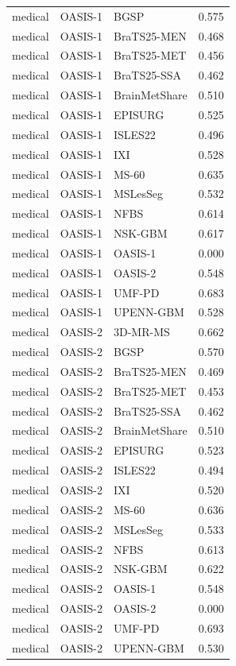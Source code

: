 \begin{tabular}{lllr}
medical & OASIS-1 & BGSP & 0.575 \\
medical & OASIS-1 & BraTS25-MEN & 0.468 \\
medical & OASIS-1 & BraTS25-MET & 0.456 \\
medical & OASIS-1 & BraTS25-SSA & 0.462 \\
medical & OASIS-1 & BrainMetShare & 0.510 \\
medical & OASIS-1 & EPISURG & 0.525 \\
medical & OASIS-1 & ISLES22 & 0.496 \\
medical & OASIS-1 & IXI & 0.528 \\
medical & OASIS-1 & MS-60 & 0.635 \\
medical & OASIS-1 & MSLesSeg & 0.532 \\
medical & OASIS-1 & NFBS & 0.614 \\
medical & OASIS-1 & NSK-GBM & 0.617 \\
medical & OASIS-1 & OASIS-1 & 0.000 \\
medical & OASIS-1 & OASIS-2 & 0.548 \\
medical & OASIS-1 & UMF-PD & 0.683 \\
medical & OASIS-1 & UPENN-GBM & 0.528 \\
medical & OASIS-2 & 3D-MR-MS & 0.662 \\
medical & OASIS-2 & BGSP & 0.570 \\
medical & OASIS-2 & BraTS25-MEN & 0.469 \\
medical & OASIS-2 & BraTS25-MET & 0.453 \\
medical & OASIS-2 & BraTS25-SSA & 0.462 \\
medical & OASIS-2 & BrainMetShare & 0.510 \\
medical & OASIS-2 & EPISURG & 0.523 \\
medical & OASIS-2 & ISLES22 & 0.494 \\
medical & OASIS-2 & IXI & 0.520 \\
medical & OASIS-2 & MS-60 & 0.636 \\
medical & OASIS-2 & MSLesSeg & 0.533 \\
medical & OASIS-2 & NFBS & 0.613 \\
medical & OASIS-2 & NSK-GBM & 0.622 \\
medical & OASIS-2 & OASIS-1 & 0.548 \\
medical & OASIS-2 & OASIS-2 & 0.000 \\
medical & OASIS-2 & UMF-PD & 0.693 \\
medical & OASIS-2 & UPENN-GBM & 0.530 \\

\end{tabular}
